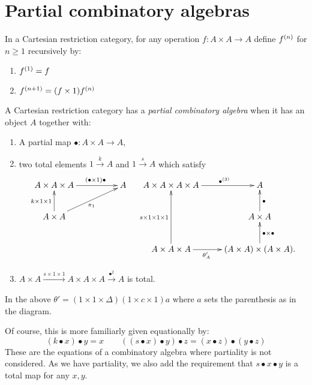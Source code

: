 \section{Partial combinatory algebras}
\label{sec:partial_combinatory_algebras}

In a Cartesian restriction category, for any operation $f:A\times A\to A$ define ${f}^{(n)}$
for $n\ge 1$  recursively by:
\begin{enumerate}[{(}i{)}]
  \item ${f}^{(1)} = f$
  \item ${f}^{(n+1)} = (f\times 1) {f}^{(n)}$
\end{enumerate}

\begin{definition}\label{def:partial_combinatory_algebra}
  A Cartesian restriction category has a \emph{partial combinatory algebra} when it has an object
  $A$ together with:
  \begin{enumerate}[{(}i{)}]
  \item A partial map $\bullet:A\times A \to A$,\label{defitem:pca-1}
  \item two total elements $1\xrightarrow{k}A$ and $1\xrightarrow{s}{A}$ which satisfy\label{defitem:pca-2}
    \[
      \xymatrix@C+25pt{
        A\times A\times A \ar[r]^(.6){(\bullet\times 1)\bullet} & A\\
        A\times A \ar[u]^{k\times1\times1} \ar[ur]_{\pi_1}
      }\quad
      \xymatrix{
        A\times A\times A\times A \ar[r]^(.6){\multibullet{3}}&A\\
        &A\times A \ar[u]_{\bullet}\\
        A\times A\times A \ar[uu]^{s\times1\times1\times1} \ar[r]_(.4){\theta_A'}
          & (A\times A) \times (A\times A). \ar[u]_{\bullet\times\bullet}
      }
    \]
    \item $A\times A \xrightarrow{s\times1\times1} A\times A\times A \xrightarrow{\bullet^2} A$ is total.\label{defitem:pca-3}
  \end{enumerate}
  In the above $\theta' = (1\times1\times\Delta)(1\times c \times 1)a$ where $a$ sets the
  parenthesis as in the diagram.
\end{definition}

Of course, this is more familiarly given equationally by:
\[
   (k\bullet x)\bullet y = x \qquad ((s\bullet x)\bullet y) \bullet z = (x\bullet z) \bullet
   (y\bullet z)
\]
These are the equations of a combinatory algebra where partiality is not considered. As we have
partiality, we also add the requirement that $s\bullet x\bullet y$ is a total map for any $x,y$.


